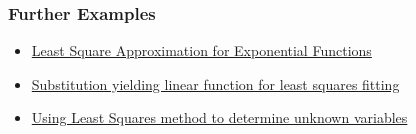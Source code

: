 \documentclass[]{beamer}
\begin{document}
%
\begin{frame}\frametitle{Further Examples\jumpBig}
\begin{itemize}
	\item \href{https://math.stackexchange.com/questions/1488747/least-square-approximation-for-exponential-functions/2163333\#2163333}{Least Square Approximation for Exponential Functions}
	\item \href{https://math.stackexchange.com/questions/1934347/substitution-yielding-linear-function-for-least-squares-fitting/2170544\#2170544}{Substitution yielding linear function for least squares fitting}
	\item \href{https://math.stackexchange.com/questions/699071/using-least-squares-method-to-determine-unknown-variables/2204288\#2204288}{Using Least Squares method to determine unknown variables}
\end{itemize}
\end{frame}
\end{document}
